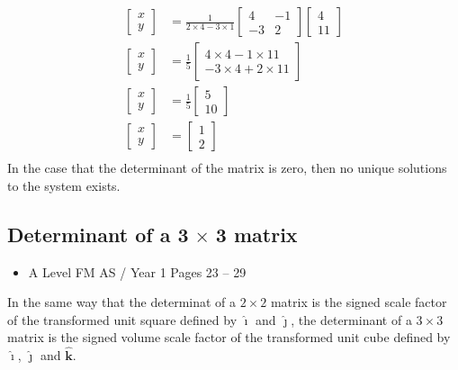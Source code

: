 \documentclass[11pt, a4paper]{article}
\begin{document}
\begin{align*}
\begin{bmatrix}x\\y\end{bmatrix}&=\frac{1}{2\times4-3\times1}\begin{bmatrix}4&-1\\-3&2\end{bmatrix}\begin{bmatrix}4\\11\end{bmatrix} \\
\begin{bmatrix}x\\y\end{bmatrix}&=\frac{1}{5}\begin{bmatrix} 4\times4-1\times11 \\ -3\times4+2\times11 \end{bmatrix}\\
\begin{bmatrix}x\\y\end{bmatrix}&=\frac{1}{5}\begin{bmatrix} 5 \\ 10 \end{bmatrix}\\
\begin{bmatrix}x\\y\end{bmatrix}&=\begin{bmatrix}1\\2\end{bmatrix}\\
\end{align*}
In the case that the determinant of the matrix is zero, then no unique solutions to the system exists.
\vspace{0.5cm}


\subsection{Determinant of a 3$\,\times\,$3 matrix}
\begin{itemize}
\item A Level FM AS / Year 1 \hspace{1cm} Pages 23 -- 29
\end{itemize} \par
In the same way that the determinat of a $2\times2$ matrix is the signed scale factor of the transformed unit square defined by $\hat{\boldsymbol{\imath}}$ and $\hat{\boldsymbol{\jmath}}$, the determinant of a $3\times3$ matrix is the signed volume scale factor of the transformed unit cube defined by $\hat{\boldsymbol{\imath}}$, $\hat{\boldsymbol{\jmath}}$ and $\hat{\boldsymbol{k}}$. \newline \par
\end{document}
